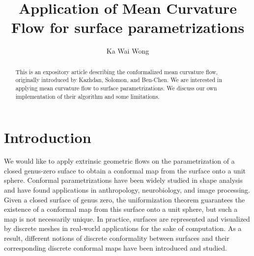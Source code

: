 \documentclass[11pt]{amsart}
\begin{document}
\title{Application of Mean Curvature Flow for surface parametrizations}

\author{Ka Wai Wong}



\begin{abstract}
This is an expository article describing the conformalized mean curvature flow, originally introduced by Kazhdan, Solomon, and Ben-Chen. We are interested in applying mean curvature flow to surface parametrizations. We discuss our own implementation of their algorithm and some limitations.
\end{abstract}

\maketitle

\section{Introduction}
We would like to apply extrinsic geometric flows on the parametrization of a closed genus-zero suface to obtain a conformal map from the surface onto a unit sphere. Conformal parametrizations have been widely studied in shape analysis and have found applications in anthropology, neurobiology, and image processing. Given a closed surface of genus zero, the uniformization theorem guarantees the existence of a conformal map from this surface onto a unit sphere, but such a map is not necessarily unique. In practice, surfaces are represented and visualized by discrete meshes in real-world applications for the sake of computation. As a result, different notions of discrete conformality between surfaces and their corresponding discrete conformal maps have been introduced and studied.

\bigbreak
\end{document}
